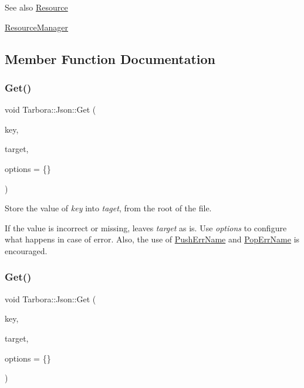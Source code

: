 \begin{DoxySeeAlso}{See also}
\hyperlink{classTarbora_1_1Resource}{Resource} 

\hyperlink{classTarbora_1_1ResourceManager}{Resource\+Manager} 
\end{DoxySeeAlso}


\subsection{Member Function Documentation}
\mbox{\label{classTarbora_1_1Json_a6767cba370c056964e4701ee7d5bab0b}} 
\subsubsection{\texorpdfstring{Get()}{Get()}\hspace{0.1cm}{\footnotesize\ttfamily [1/18]}}
{\footnotesize\ttfamily void Tarbora\+::\+Json\+::\+Get (\begin{DoxyParamCaption}\item[{const char $\ast$}]{key,  }\item[{raw\+\_\+json $\ast$}]{target,  }\item[{\hyperlink{structTarbora_1_1JsonOptions}{Json\+Options}}]{options = {\ttfamily \{\}} }\end{DoxyParamCaption})}



Store the value of {\itshape key} into {\itshape taget}, from the root of the file. 

If the value is incorrect or missing, leaves {\itshape target} as is. Use {\itshape options} to configure what happens in case of error. Also, the use of \hyperlink{classTarbora_1_1Json_a061eac4f16dac3b9b3a26a66de0ea8f0}{Push\+Err\+Name} and \hyperlink{classTarbora_1_1Json_a14019f06d3bd76edd6a6e78134519d11}{Pop\+Err\+Name} is encouraged. \mbox{\label{classTarbora_1_1Json_ad3ff74537c4cb9c9747006a4d04079b4}} 
\subsubsection{\texorpdfstring{Get()}{Get()}\hspace{0.1cm}{\footnotesize\ttfamily [2/18]}}
{\footnotesize\ttfamily void Tarbora\+::\+Json\+::\+Get (\begin{DoxyParamCaption}\item[{const char $\ast$}]{key,  }\item[{bool $\ast$}]{target,  }\item[{\hyperlink{structTarbora_1_1JsonOptions}{Json\+Options}}]{options = {\ttfamily \{\}} }\end{DoxyParamCaption})}

